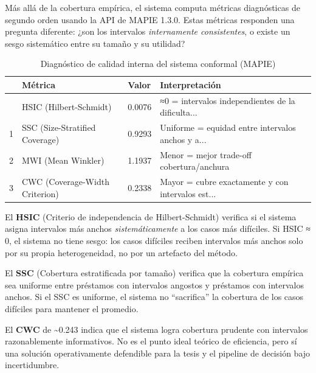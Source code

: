 \documentclass[
  spanish,
  11pt,
  letterpaper,
]{scrbook}
\theoremstyle{plain}
\theoremstyle{remark}
\begin{document}
Más allá de la cobertura empírica, el sistema computa métricas
diagnósticas de segundo orden usando la API de MAPIE 1.3.0. Estas
métricas responden una pregunta diferente: ¿son los intervalos
\emph{internamente consistentes}, o existe un sesgo sistemático entre su
tamaño y su utilidad?

{

\begin{longtable}[]{@{}llll@{}}

\caption{\label{tbl-mapie-diagnostics}Diagnóstico de calidad interna del
sistema conformal (MAPIE)}

\tabularnewline

\toprule\noalign{}
& Métrica & Valor & Interpretación \\
\midrule\noalign{}
\endhead
\bottomrule\noalign{}
\endlastfoot
0 & HSIC (Hilbert-Schmidt) & 0.0076 & ≈0 = intervalos independientes de
la dificulta... \\
1 & SSC (Size-Stratified Coverage) & 0.9293 & Uniforme = equidad entre
intervalos anchos y a... \\
2 & MWI (Mean Winkler) & 1.1937 & Menor = mejor trade-off
cobertura/anchura \\
3 & CWC (Coverage-Width Criterion) & 0.2338 & Mayor = cubre exactamente
y con intervalos est... \\

\end{longtable}

}

\begin{tcolorbox}[enhanced jigsaw, arc=.35mm, bottomrule=.15mm, bottomtitle=1mm, breakable, colback=white, colbacktitle=quarto-callout-note-color!10!white, colframe=quarto-callout-note-color-frame, coltitle=black, left=2mm, leftrule=.75mm, opacityback=0, opacitybacktitle=0.6, rightrule=.15mm, title=\textcolor{quarto-callout-note-color}{\faInfo}\hspace{0.5em}{HSIC y SSC: diagnóstico de equidad interna}, titlerule=0mm, toprule=.15mm, toptitle=1mm]

El \textbf{HSIC} (Criterio de independencia de Hilbert-Schmidt) verifica
si el sistema asigna intervalos más anchos \emph{sistemáticamente} a los
casos más difíciles. Si HSIC ≈ 0, el sistema no tiene sesgo: los casos
difíciles reciben intervalos más anchos solo por su propia
heterogeneidad, no por un artefacto del método.

El \textbf{SSC} (Cobertura estratificada por tamaño) verifica que la
cobertura empírica sea uniforme entre préstamos con intervalos angostos
y préstamos con intervalos anchos. Si el SSC es uniforme, el sistema no
``sacrifica'' la cobertura de los casos difíciles para mantener el
promedio.

El \textbf{CWC} de \textasciitilde0.243 indica que el sistema logra
cobertura prudente con intervalos razonablemente informativos. No es el
punto ideal teórico de eficiencia, pero sí una solución operativamente
defendible para la tesis y el pipeline de decisión bajo incertidumbre.

\end{tcolorbox}
\end{document}
